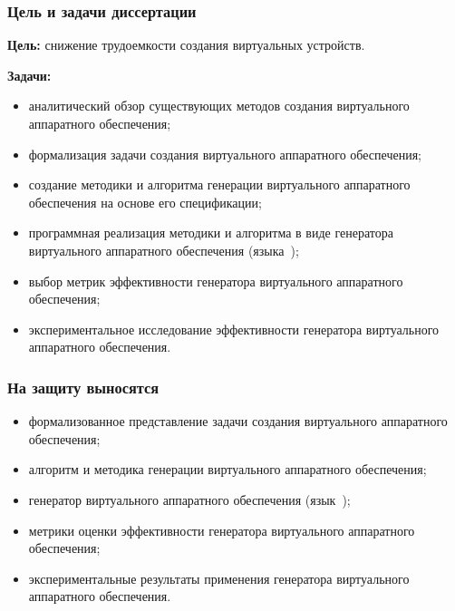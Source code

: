 \begin{frame}%
    \frametitle{Цель и задачи диссертации}
    \textbf{Цель:} снижение трудоемкости создания виртуальных устройств.

    \textbf{Задачи:}
    \begin{itemize}
        \item аналитический обзор существующих методов создания виртуального аппаратного обеспечения;
        \item формализация задачи создания виртуального аппаратного обеспечения;
        \item создание методики и алгоритма генерации виртуального аппаратного обеспечения на основе его спецификации;
        \item программная реализация методики и алгоритма в виде генератора
              виртуального аппаратного обеспечения \mbox{(языка {\mylanguage});}
        \item выбор метрик эффективности генератора виртуального аппаратного обеспечения;
        \item экспериментальное исследование эффективности генератора виртуального аппаратного обеспечения.
    \end{itemize}
\end{frame}


\begin{frame}%
    \frametitle{На защиту выносятся}
    \begin{itemize}
        \item формализованное представление задачи создания виртуального аппаратного обеспечения;
        \item алгоритм и методика генерации виртуального аппаратного обеспечения;
        \item генератор виртуального аппаратного обеспечения \mbox{(язык {\mylanguage});}
        \item метрики оценки эффективности генератора виртуального аппаратного обеспечения;
        \item экспериментальные результаты применения генератора виртуального аппаратного обеспечения.
    \end{itemize}
\end{frame}


